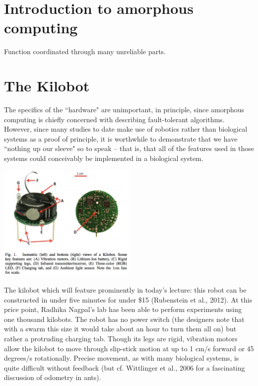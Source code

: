 \documentclass{article}
\begin{document}
\large

\section*{Introduction to amorphous computing}

Function coordinated through many unreliable parts.

\section*{The Kilobot}

The specifics of the ``hardware" are unimportant, in principle, since amorphous computing is chiefly concerned with describing fault-tolerant algorithms. However, since many studies to date make use of robotics rather than biological systems as a proof of principle, it is worthwhile to demonstrate that we have ``nothing up our sleeve" so to speak -- that is, that all of the features used in those systems could conceivably be implemented in a biological system.

\begin{center}
\includegraphics[width=0.5\textwidth]{kilobot.pdf}
\end{center}

The kilobot which will feature prominently in today's lecture: this robot can be constructed in under five minutes for under \$15 (Rubenstein et al., 2012). At this price point, Radhika Nagpal's lab has been able to perform experiments using one thousand kilobots. The robot has no power switch (the designers note that with a swarm this size it would take about an hour to turn them all on) but rather a protruding charging tab. Though its legs are rigid, vibration motors allow the kilobot to move through slip-stick motion at up to 1 cm/s forward or 45 degrees/s rotationally. Precise movement, as with many biological systems, is quite difficult without feedback (but cf. Wittlinger et al., 2006 for a fascinating discussion of odometry in ants).\\
\end{document}
